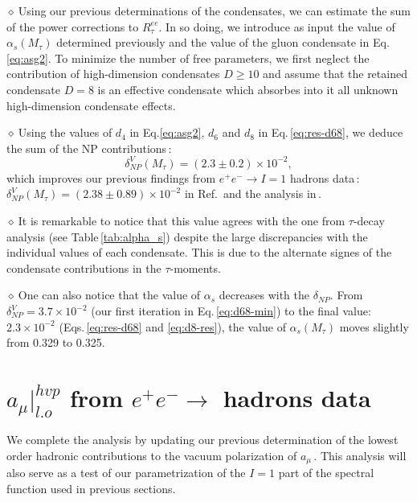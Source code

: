 \documentclass[review]{elsarticle}
\def\beq{\begin{equation}}
\def\eeq{\end{equation}}
\def\d{$\diamond~$}
\begin{document}
\d  Using our previous determinations of the condensates, we can estimate the sum of the power corrections to $R^{ee}_{\tau}$.
   In so doing, we introduce as input the value of $\alpha_s(M_\tau)$ determined previously and the value of the gluon condensate in Eq.\,\ref{eq:asg2}. To minimize the number of free parameters, we first neglect the contribution of high-dimension condensates $D\geq 10$ and assume that the retained condensate $D=8$ is an effective condensate which absorbes into it all unknown high-dimension condensate effects. 
   
 
\d  Using the values of $d_4$ in Eq.\ref{eq:asg2}, $d_6$ and $d_8$ in Eq.\,\ref{eq:res-d68}, we deduce the sum of the NP contributions\,:
\beq
\delta^V_{NP}(M_\tau)= (2.3\pm 0.2)\times 10^{-2},
\eeq
which improves our previous findings from $e^+e^-\to I=1$ hadrons data\,: $\delta^V_{NP}(M_\tau)= (2.38\pm 0.89)\times 10^{-2}$ in Ref.\,\cite{SN95} and the analysis in\,\cite{SNTAU}.  

\d It is remarkable to notice that this value agrees with the one from $\tau$-decay analysis (see Table\,\ref{tab:alpha_s}) despite the large discrepancies with the individual values of each condensate.  This is due to the alternate signes of the condensate contributions in the $\tau$-moments.

\d One can also notice that the value of $\alpha_s$ decreases with the $\delta_{NP}$.  From $\delta^V_{NP}=3.7\times 10^{-2}$  (our first iteration in Eq.\,\ref{eq:d68-min}) to the final value: $2.3 \times 10^{-2}$ (Eqs.\,\ref{eq:res-d68} and \ref{eq:d8-res}), the value of $\alpha_s(M_\tau)$ moves slightly  from 0.329 to 0.325. 

\section{$a_\mu\vert^{hvp}_{l.o}$ from   $e^+e^-\to$ hadrons data}
We complete the analysis by updating our previous determination of the  lowest order hadronic contributions  to the vacuum polarization of $a_\mu$\,\cite{SNamu}.  This analysis will also serve as a test of our parametrization of the $I=1$ part of the spectral function used in previous sections. 
\end{document}

